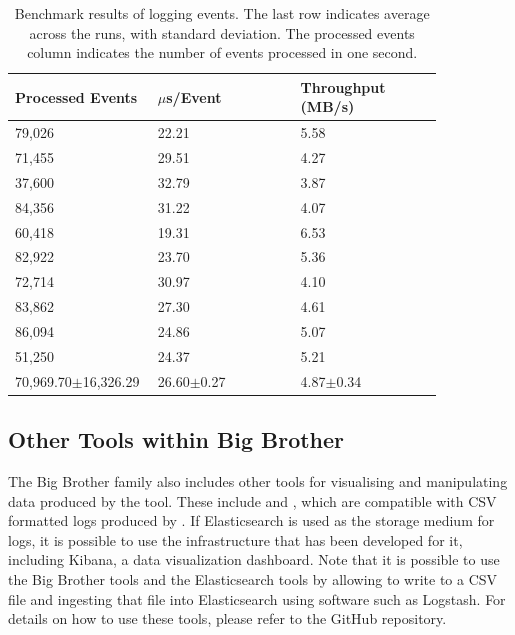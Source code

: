 \begin{table}
\centering
\begin{tabular}{p{0.28\linewidth}p{0.28\linewidth}p{0.29\linewidth}}
	\hline
	Processed Events    & $\mu$s/Event   & Throughput (MB/s) \\ \hline
	79,026     & 22.21          & 5.58              \\
	71,455     & 29.51          & 4.27              \\
	37,600     & 32.79          & 3.87              \\
	84,356     & 31.22          & 4.07              \\
	60,418     & 19.31          & 6.53              \\
	82,922     & 23.70          & 5.36              \\
	72,714     & 30.97          & 4.10              \\
	83,862     & 27.30          & 4.61              \\
	86,094     & 24.86          & 5.07              \\
	51,250     & 24.37          & 5.21              \\ \hline\hline
	70,969.70$\pm$16,326.29 & 26.60$\pm$0.27 & 4.87$\pm$0.34     \\ \hline
\end{tabular}
\caption{Benchmark results of logging events. The last row indicates average across the runs, with standard deviation. The processed events column indicates the number of events processed in one second.\vspace{-24pt}}
\label{tbl:bench}
\end{table}



\subsection{Other Tools within Big Brother}

The Big Brother family also includes other tools for visualising and manipulating data produced by the \bb tool. These include \bbheat and \bbstat, which are compatible with CSV formatted logs produced by \bb. If Elasticsearch is used as the storage medium for logs, it is possible to use the infrastructure that has been developed for it, including Kibana, a data visualization dashboard. Note that it is possible to use the Big Brother tools and the Elasticsearch tools by allowing \bb to write to a CSV file and ingesting that file into Elasticsearch using software such as Logstash. For details on how to use these tools, please refer to the GitHub repository.

